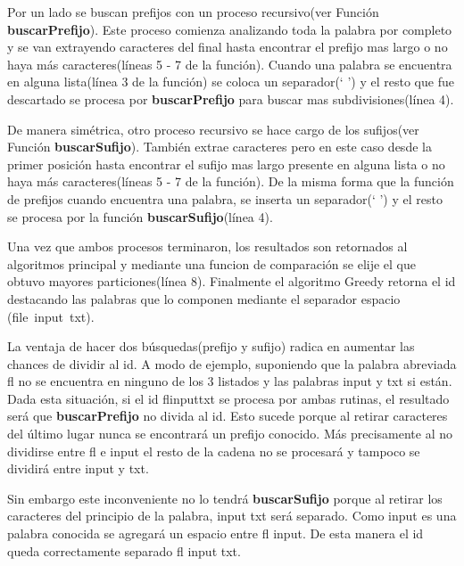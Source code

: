 \documentclass[a4paper,12pt]{report}
\begin{document}
Por un lado se buscan prefijos con un proceso recursivo(ver Función \mbox{\textbf{buscarPrefijo}}). Este proceso comienza analizando toda la palabra por completo y se van extrayendo caracteres del final hasta encontrar el prefijo mas largo o no haya más caracteres(líneas 5 - 7 de la función). %
Cuando una palabra se encuentra en alguna lista(línea 3 de la función) se coloca un separador(` ') y el resto que fue descartado se procesa por \textbf{buscarPrefijo} para buscar mas subdivisiones(línea 4).

De manera simétrica, otro proceso recursivo se hace cargo de los sufijos(ver Función \textbf{buscarSufijo}). También extrae caracteres pero en este caso desde la primer posición hasta encontrar el sufijo mas largo presente en alguna lista o no haya más caracteres(líneas 5 - 7 de la función). %
De la misma forma que la función de prefijos cuando encuentra una palabra, se inserta un separador(` ') y el resto se procesa por la función \textbf{buscarSufijo}(línea 4).

Una vez que ambos procesos terminaron, los resultados son retornados al algoritmos principal y mediante una funcion de comparación se elije el que obtuvo mayores particiones(línea 8). Finalmente el algoritmo Greedy retorna el id destacando las palabras que lo componen mediante el separador espacio \mbox{(\textsf{file input txt})}.

La ventaja de hacer dos búsquedas(prefijo y sufijo) radica en aumentar las chances de dividir al id. A modo de ejemplo, suponiendo que la palabra abreviada \textsf{fl}
no se encuentra en ninguno de los 3 listados y las palabras \textsf{input} y \textsf{txt} si están. Dada esta situación, si el id \textsf{flinputtxt} se procesa por ambas rutinas, el resultado será que \textbf{buscarPrefijo} no divida al id. Esto sucede porque al retirar caracteres del último lugar nunca se encontrará un prefijo conocido. Más precisamente al no dividirse entre \textsf{fl} e \textsf{input} el resto de la cadena no se procesará y tampoco se dividirá entre \textsf{input} y \textsf{txt}. 

Sin embargo este inconveniente no lo tendrá \textbf{buscarSufijo} porque al retirar los caracteres del principio de la palabra, \textsf{input txt} será separado. Como \textsf{input} es una palabra conocida se agregará un espacio entre \textsf{fl input}. De esta manera el id queda correctamente separado \textsf{fl input txt}.\\
\end{document}
